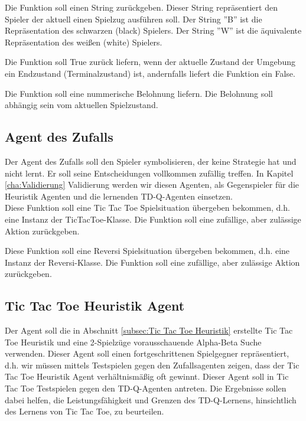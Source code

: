 Die Funktion soll einen String zurückgeben. Dieser String repräsentiert den Spieler der aktuell einen Spielzug ausführen soll. Der String ''B'' ist die Repräsentation des schwarzen (black) Spielers. Der String ''W'' ist die äquivalente Repräsentation des weißen (white) Spielers.

Die Funktion soll True zurück liefern, wenn der aktuelle Zustand der Umgebung ein Endzustand (Terminalzustand) ist, andernfalls liefert die Funktion ein False.

Die Funktion soll eine nummerische Belohnung liefern. Die Belohnung soll abhängig sein vom aktuellen Spielzustand.
\newpage

\subsection{Agent des Zufalls}
Der Agent des Zufalls soll den Spieler symbolisieren, der keine Strategie hat und nicht lernt. Er soll seine Entscheidungen vollkommen zufällig treffen. In Kapitel \ref{cha:Validierung} Validierung werden wir diesen Agenten, als Gegenspieler für die Heuristik Agenten und die lernenden TD-Q-Agenten einsetzen. \\

Diese Funktion soll eine Tic Tac Toe Spielsituation übergeben bekommen, d.h. eine Instanz der TicTacToe-Klasse. Die Funktion soll eine zufällige, aber zulässige Aktion zurückgeben.

Diese Funktion soll eine Reversi Spielsituation übergeben bekommen, d.h. eine Instanz der Reversi-Klasse. Die Funktion soll eine zufällige, aber zulässige Aktion zurückgeben.

\subsection{Tic Tac Toe Heuristik Agent}
Der Agent soll die in Abschnitt \ref{subsec:Tic Tac Toe Heuristik} erstellte Tic Tac Toe Heuristik und eine 2-Spielzüge vorausschauende Alpha-Beta Suche verwenden. Dieser Agent soll einen fortgeschrittenen Spielgegner repräsentiert, d.h. wir müssen mittels Testspielen gegen den Zufallsagenten zeigen, dass der Tic Tac Toe Heuristik Agent verhältnismäßig oft gewinnt. Dieser Agent soll in Tic Tac Toe Testspielen gegen den TD-Q-Agenten antreten. Die Ergebnisse sollen dabei helfen, die Leistungsfähigkeit und Grenzen des TD-Q-Lernens, hinsichtlich des Lernens von Tic Tac Toe, zu beurteilen. 

